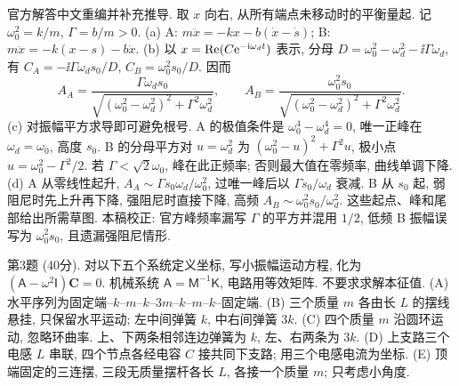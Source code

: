 \begin{solution}
官方解答中文重编并补充推导. 取 $x$ 向右, 从所有端点未移动时的平衡量起. 记 $\omega_0^2=k/m$, $\Gamma=b/m>0$.
(a) A: $m\ddot x=-kx-b(\dot x-\dot s)$; B: $m\ddot x=-k(x-s)-b\dot x$.
(b) 以 $x=\operatorname{Re}(C\mathrm e^{-\mathrm i\omega_dt})$ 表示, 分母 $D=\omega_0^2-\omega_d^2-\ii\Gamma\omega_d$, 有 $C_A=-\ii\Gamma\omega_ds_0/D$, $C_B=\omega_0^2s_0/D$. 因而
\[
 A_A=\frac{\Gamma\omega_ds_0}{\sqrt{(\omega_0^2-\omega_d^2)^2+\Gamma^2\omega_d^2}},\qquad
 A_B=\frac{\omega_0^2s_0}{\sqrt{(\omega_0^2-\omega_d^2)^2+\Gamma^2\omega_d^2}}.
\]
(c) 对振幅平方求导即可避免根号. A 的极值条件是 $\omega_0^4-\omega_d^4=0$, 唯一正峰在 $\omega_d=\omega_0$, 高度 $s_0$. B 的分母平方对 $u=\omega_d^2$ 为 $(\omega_0^2-u)^2+\Gamma^2u$, 极小点 $u=\omega_0^2-\Gamma^2/2$. 若 $\Gamma<\sqrt2\omega_0$, 峰在此正频率; 否则最大值在零频率, 曲线单调下降.
(d) A 从零线性起升, $A_A\sim\Gamma s_0\omega_d/\omega_0^2$, 过唯一峰后以 $\Gamma s_0/\omega_d$ 衰减. B 从 $s_0$ 起, 弱阻尼时先上升再下降, 强阻尼时直接下降, 高频 $A_B\sim\omega_0^2s_0/\omega_d^2$. 这些起点、峰和尾部给出所需草图. 本稿校正: 官方峰频率漏写 $\Gamma$ 的平方并混用 $1/2$, 低频 B 振幅误写为 $\omega_0^2s_0$, 且遗漏强阻尼情形.
\end{solution}
\begin{exercise}\label{exam:e1.3}
第3题 (40分). 对以下五个系统定义坐标, 写小振幅运动方程, 化为 $(\mathsf A-\omega^2\mathsf I)\boldsymbol C=0$. 机械系统 $\mathsf A=\mathsf M^{-1}\mathsf K$, 电路用等效矩阵. 不要求求解本征值.
(A) 水平序列为固定端--$k$--$m$--$k$--$3m$--$k$--$m$--$k$--固定端.
(B) 三个质量 $m$ 各由长 $L$ 的摆线悬挂, 只保留水平运动; 左中间弹簧 $k$, 中右间弹簧 $3k$.
(C) 四个质量 $m$ 沿圆环运动, 忽略环曲率. 上、下两条相邻连边弹簧为 $k$, 左、右两条为 $3k$.
(D) 上支路三个电感 $L$ 串联, 四个节点各经电容 $C$ 接共同下支路; 用三个电感电流为坐标.
(E) 顶端固定的三连摆, 三段无质量摆杆各长 $L$, 各接一个质量 $m$; 只考虑小角度.
\end{exercise}
